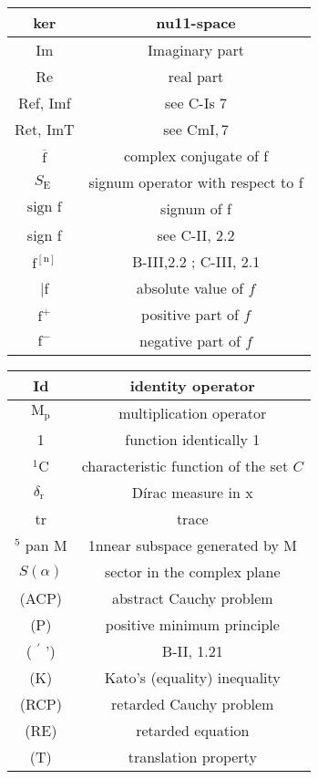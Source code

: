 \begin{tabular}{|c|c|}
\hline ker & nu11-space \\
\hline Im & Imaginary part \\
\hline Re & real part \\
\hline Ref, Imf & see C-Is 7 \\
\hline Ret, ImT & see $\mathrm{CmI}, 7$ \\
\hline $\overline{\mathrm{f}}$ & complex conjugate of f \\
\hline $S_{\text {E }}$ & signum operator with respect to f \\
\hline $\operatorname{sign~f}$ & signum of f \\
\hline sign f & see C-II, 2.2 \\
\hline $\mathrm{f}^{[\mathrm{n}]}$ & B-III,2.2 ; C-III, 2.1 \\
\hline |f & absolute value of $f$ \\
\hline $\mathrm{f}^{+}$ & positive part of $f$ \\
\hline $\mathrm{f}^{-}$ & negative part of $f$ \\
\hline
\end{tabular}
\begin{tabular}{|c|c|}
\hline Id & identity operator \\
\hline $\mathrm{M}_{\mathrm{p}}$ & multiplication operator \\
\hline 1 & function identically 1 \\
\hline ${ }^{1} \mathrm{C}$ & characteristic function of the set $C$ \\
\hline $\delta_{\text {r }}$ & Dírac measure in x \\
\hline tr & trace \\
\hline ${ }^{5}$ pan M & 1nnear subspace generated by M \\
\hline $S(\alpha)$ & sector in the complex plane \\
\hline (ACP) & abstract Cauchy problem \\
\hline (P) & positive minimum principle \\
\hline ( ${ }^{\prime}$ ') & B-II, 1.21 \\
\hline (K) & Kato's (equality) inequality \\
\hline (RCP) & retarded Cauchy problem \\
\hline (RE) & retarded equation \\
\hline (T) & translation property \\
\hline
\end{tabular}